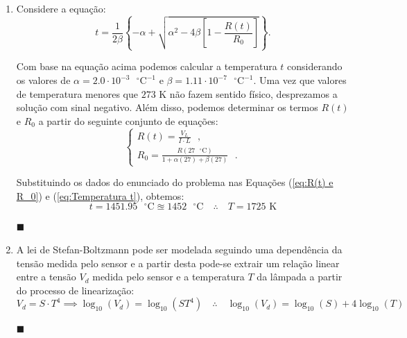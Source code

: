 \documentclass[12pt,a4paper]{article}
\begin{document}
\begin{enumerate}
    \item  Considere a equação:
    \begin{equation} \label{eq:Temperatura t}
        t=\frac{1}{2\beta}\left\{-\alpha+\sqrt{\alpha^{2}-4\beta\left[1-\frac{R\left(t\right)}{R_{0}}\right]}\right\}.
    \end{equation}

    Com base na equação acima podemos calcular a temperatura $t$ considerando os valores de $\alpha=2.0\cdot10^{-3}\text{ }^{\circ}\text{C}^{-1}$ e $\beta=1.11\cdot10^{-7}\text{ }^{\circ}\text{C}^{-1}$. Uma vez que valores de temperatura menores que $273\text{ K}$ não fazem sentido físico, desprezamos a solução com sinal negativo. Além disso, podemos determinar os termos $R(t)$ e $R_0$ a partir do seguinte conjunto de equações:
    \begin{equation} \label{eq:R(t) e R_0}
        \begin{cases}
            R(t)=\frac{V_L}{I\cdot L}\text{ }, \\
            R_0=\frac{R(27\text{ }^{\circ}\text{C})}{1+\alpha(27)+\beta(27)}\text{ }. 
        \end{cases}
    \end{equation}

    Substituindo os dados do enunciado do problema nas Equações (\ref{eq:R(t) e R_0}) e (\ref{eq:Temperatura t}), obtemos:
    \begin{equation}
        t=1451.95\text{ }^{\circ}\text{C}\approxeq1452\text{ }^{\circ}\text{C}\quad\therefore\quad\boxed{T=1725\text{ K}}
    \end{equation}
    \begin{flushright}
        $\blacksquare$
    \end{flushright}


    \item A lei de Stefan-Boltzmann pode ser modelada seguindo uma dependência da tensão medida pelo sensor e a partir desta pode-se extrair um relação linear entre a tensão $V_d$ medida pelo sensor e a temperatura $T$ da lâmpada a partir do processo de linearização:
    \begin{equation}
        V_d=S\cdot T^4\implies \log_{10}{(V_d)}=\log_{10}{(ST^4)}\quad\therefore\quad\boxed{\log_{10}{(V_d)}=\log_{10}{(S)}+4\log_{10}{(T)}}
    \end{equation}
    \begin{flushright}
        $\blacksquare$
    \end{flushright}


\end{enumerate}
\end{document}
